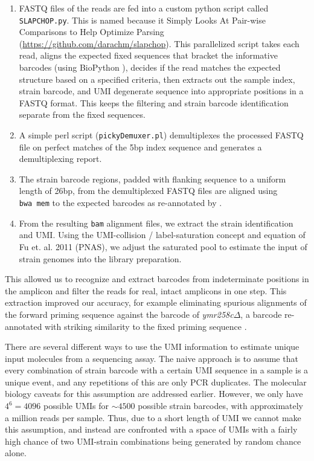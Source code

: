 \begin{enumerate}
  \setlength\itemsep{1em}
  \item
  FASTQ files of the reads are fed into a custom python script called
  \texttt{SLAPCHOP.py}. This is named because it Simply Looks At
  Pair-wise Comparisons to Help Optimize Parsing 
  (\url{https://github.com/darachm/slapchop}). This
  parallelized script takes each read, aligns the expected fixed
  sequences that bracket the informative barcodes (using
  BioPython \cite{cock2009biopython}), decides if the read matches the
  expected structure based on a specified criteria, then extracts out 
  the sample index, strain barcode, and UMI degenerate sequence into 
  appropriate positions in a FASTQ format. This keeps the filtering 
  and strain barcode identification separate from the fixed sequences.
  \item
  A simple perl script (\texttt{pickyDemuxer.pl}) demultiplexes the
  processed FASTQ file on perfect matches of the 5bp index sequence and
  generates a demultiplexing report.
  \item
  The strain barcode regions, padded with flanking sequence to a uniform
  length of 26bp, from the demultiplexed FASTQ files are aligned using
  \texttt{bwa\ mem} \parencite{li2013aligning}
  to the
  expected barcodes as re-annotated by \cite{smith2009quantitative}.
  \item
  From the resulting \texttt{bam} alignment files, we extract the strain
  identification and UMI. Using the UMI-collision / label-saturation
  concept and equation of Fu et. al. 2011 (PNAS), we adjust the
  saturated pool to estimate the input of strain genomes into the
  library preparation.
\end{enumerate}

This allowed us to recognize and extract barcodes from indeterminate
positions in the amplicon and filter the reads for real, intact
amplicons in one step. This extraction improved our accuracy, for
example eliminating spurious alignments of the forward priming sequence
against the barcode of \emph{ymr258c}\(\Delta\), a barcode re-annotated
with striking similarity to the fixed priming sequence
\cite{smith2009quantitative}.

There are several different ways to use the UMI information to estimate
unique input molecules from a sequencing assay. The naive approach is to
assume that every combination of strain barcode with a certain UMI
sequence in a sample is a unique event, and any repetitions of this are
only PCR duplicates. 
The molecular biology caveats for this assumption are addressed 
earlier.
However, we only have \(4^6=4096\) possible UMIs for \(\sim4500\) 
possible strain
barcodes, with approximately a million reads per sample. Thus, due to a
short length of UMI we cannot make this assumption, and instead are
confronted with a space of UMIs with a fairly high chance of two
UMI-strain combinations being generated by random chance alone. 

